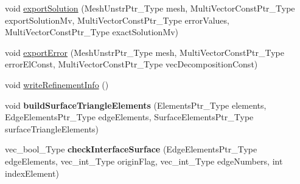 \begin{DoxyCompactItemize}
\item 
void \hyperlink{classFEDD_1_1AdaptiveMeshRefinement_a2aef7d351efdf637713d5c34c2898672}{export\+Solution} (Mesh\+Unstr\+Ptr\+\_\+\+Type mesh, Multi\+Vector\+Const\+Ptr\+\_\+\+Type export\+Solution\+Mv, Multi\+Vector\+Const\+Ptr\+\_\+\+Type error\+Values, Multi\+Vector\+Const\+Ptr\+\_\+\+Type exact\+Solution\+Mv)
\item 
void \hyperlink{classFEDD_1_1AdaptiveMeshRefinement_a1b52ea69beece0eb7a11fec246bd5ef3}{export\+Error} (Mesh\+Unstr\+Ptr\+\_\+\+Type mesh, Multi\+Vector\+Const\+Ptr\+\_\+\+Type error\+El\+Const, Multi\+Vector\+Const\+Ptr\+\_\+\+Type vec\+Decomposition\+Const)
\item 
void \hyperlink{classFEDD_1_1AdaptiveMeshRefinement_ae0480d80e226050e4a73cab5bb15b16d}{write\+Refinement\+Info} ()
\item 
\mbox{\label{classFEDD_1_1AdaptiveMeshRefinement_a4cdd9b68e15a5a3d3408fdbf933e2beb}} 
void {\bfseries build\+Surface\+Triangle\+Elements} (Elements\+Ptr\+\_\+\+Type elements, Edge\+Elements\+Ptr\+\_\+\+Type edge\+Elements, Surface\+Elements\+Ptr\+\_\+\+Type surface\+Triangle\+Elements)
\item 
\mbox{\label{classFEDD_1_1AdaptiveMeshRefinement_a2dcc6cb8430ece1eaf52f560f8466d92}} 
vec\+\_\+bool\+\_\+\+Type {\bfseries check\+Interface\+Surface} (Edge\+Elements\+Ptr\+\_\+\+Type edge\+Elements, vec\+\_\+int\+\_\+\+Type origin\+Flag, vec\+\_\+int\+\_\+\+Type edge\+Numbers, int index\+Element)
\end{DoxyCompactItemize}
